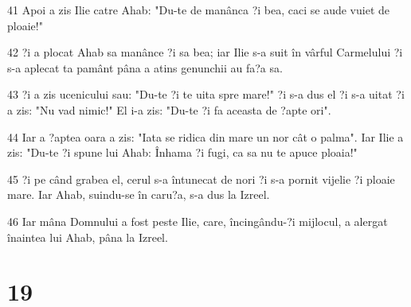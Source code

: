 \par 41 Apoi a zis Ilie catre Ahab: "Du-te de manânca ?i bea, caci se aude vuiet de ploaie!"
\par 42 ?i a plocat Ahab sa manânce ?i sa bea; iar Ilie s-a suit în vârful Carmelului ?i s-a aplecat ta pamânt pâna a atins genunchii au fa?a sa.
\par 43 ?i a zis ucenicului sau: "Du-te ?i te uita spre mare!" ?i s-a dus el ?i s-a uitat ?i a zis: "Nu vad nimic!" El i-a zis: "Du-te ?i fa aceasta de ?apte ori".
\par 44 Iar a ?aptea oara a zis: "Iata se ridica din mare un nor cât o palma". Iar Ilie a zis: "Du-te ?i spune lui Ahab: Înhama ?i fugi, ca sa nu te apuce ploaia!"
\par 45 ?i pe când grabea el, cerul s-a întunecat de nori ?i s-a pornit vijelie ?i ploaie mare. Iar Ahab, suindu-se în caru?a, s-a dus la Izreel.
\par 46 Iar mâna Domnului a fost peste Ilie, care, încingându-?i mijlocul, a alergat înaintea lui Ahab, pâna la Izreel.

\chapter{19}

